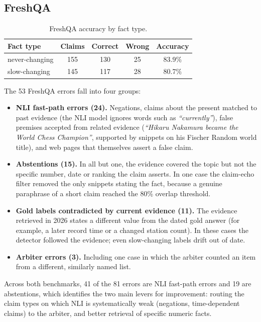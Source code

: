 \subsection{FreshQA}

\begin{table}[htbp]
\centering
\caption{FreshQA accuracy by fact type.}
\label{tab:facttype}
\begin{tabular}{@{}lcccc@{}}
\toprule
Fact type & Claims & Correct & Wrong & Accuracy \\
\midrule
never-changing & 155 & 130 & 25 & 83.9\% \\
slow-changing & 145 & 117 & 28 & 80.7\% \\
\bottomrule
\end{tabular}
\end{table}

The 53 FreshQA errors fall into four groups:
\begin{itemize}[itemsep=0.3em]
  \item \textbf{NLI fast-path errors (24).} Negations, claims about the present matched to past evidence (the NLI model ignores words such as \emph{``currently''}), false premises accepted from related evidence (\emph{``Hikaru Nakamura became the World Chess Champion''}, supported by snippets on his Fischer Random world title), and web pages that themselves assert a false claim.
  \item \textbf{Abstentions (15).} In all but one, the evidence covered the topic but not the specific number, date or ranking the claim asserts. In one case the claim-echo filter removed the only snippets stating the fact, because a genuine paraphrase of a short claim reached the 80\% overlap threshold.
  \item \textbf{Gold labels contradicted by current evidence (11).} The evidence retrieved in 2026 states a different value from the dated gold answer (for example, a later record time or a changed station count). In these cases the detector followed the evidence; even slow-changing labels drift out of date.
  \item \textbf{Arbiter errors (3).} Including one case in which the arbiter counted an item from a different, similarly named list.
\end{itemize}

Across both benchmarks, 41 of the 81 errors are NLI fast-path errors and 19 are abstentions, which identifies the two main levers for improvement: routing the claim types on which NLI is systematically weak (negations, time-dependent claims) to the arbiter, and better retrieval of specific numeric facts.
